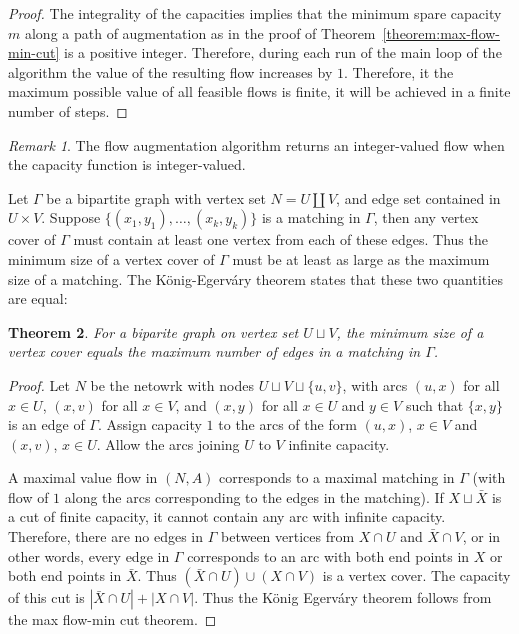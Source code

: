 \documentclass{amsbook}
\newtheorem{theorem}{Theorem}[section]
\theoremstyle{definition}
\theoremstyle{remark}
\newtheorem{remark}[theorem]{Remark}
\begin{document}
\begin{proof}
  The integrality of the capacities implies that the minimum spare capacity $m$ along a path of augmentation as in the proof of Theorem~\ref{theorem:max-flow-min-cut} is a positive integer.
  Therefore, during each run of the main loop of the algorithm the value of the resulting flow increases by $1$.
  Therefore, it the maximum possible value of all feasible flows is finite, it will be achieved in a finite number of steps.
\end{proof}
\begin{remark}
  The flow augmentation algorithm returns an integer-valued flow when the capacity function is integer-valued.
\end{remark}
Let $\Gamma$ be a bipartite graph with vertex set $N=U\coprod V$, and edge set contained in $U\times V$.
Suppose $\{(x_1,y_1),\dotsc,(x_k,y_k)\}$ is a matching in $\Gamma$, then any vertex cover of $\Gamma$ must contain at least one vertex from each of these edges.
Thus the minimum size of a vertex cover of $\Gamma$ must be at least as large as the maximum size of a matching.
The K\"onig-Egerv\'ary theorem states that these two quantities are equal:
\begin{theorem}
  For a biparite graph on vertex set $U\sqcup V$, the minimum size of a vertex cover equals the maximum number of edges in a matching in $\Gamma$.
\end{theorem}
\begin{proof}
  Let $N$ be the netowrk with nodes $U\sqcup V\sqcup \{u,v\}$, with arcs $(u,x)$ for all $x\in U$, $(x,v)$ for all $x\in V$, and $(x,y)$ for all $x\in U$ and $y\in V$ such that $\{x,y\}$ is an edge of $\Gamma$.
  Assign capacity $1$ to the arcs of the form $(u,x)$, $x\in V$ and $(x,v)$, $x\in U$.
  Allow the arcs joining $U$ to $V$ infinite capacity.

  A maximal value flow in $(N,A)$ corresponds to a maximal matching in $\Gamma$ (with flow of $1$ along the arcs corresponding to the edges in the matching).
  If $X\sqcup \bar X$ is a cut of finite capacity, it cannot contain any arc with infinite capacity.
  Therefore, there are no edges in $\Gamma$ between vertices from $X\cap U$ and $\bar X\cap V$, or in other words, every edge in $\Gamma$ corresponds to an arc with both end points in $X$ or both end points in $\bar X$.
  Thus $(\bar X\cap U)\cup (X\cap V)$ is a vertex cover.
  The capacity of this cut is $|\bar X\cap U|+|X\cap V|$.
  Thus the K\"onig Egerv\'ary theorem follows from the max flow-min cut theorem.
\end{proof}
\end{document}
